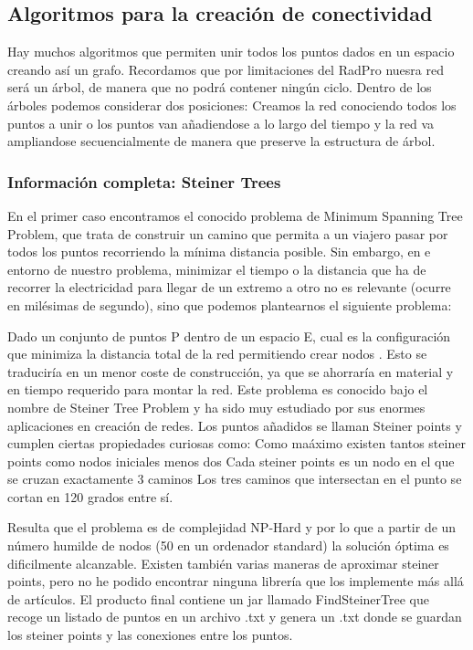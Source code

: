 \documentclass[12pt,a4paper,openright,oneside]{article}
\numberwithin{equation}{section}
\theoremstyle{definition}
\begin{document}
\subsection{Algoritmos para la creación de conectividad}
Hay muchos algoritmos que permiten unir todos los puntos dados en un espacio creando así un grafo. Recordamos que por limitaciones del RadPro nuesra red será un árbol, de manera que no podrá contener ningún ciclo. Dentro de los árboles podemos considerar dos posiciones: Creamos la red conociendo todos los puntos a unir o los puntos van añadiendose a lo largo del tiempo y la red va ampliandose secuencialmente de manera que preserve la estructura de árbol.

\subsubsection{Información completa: Steiner Trees}
En el primer caso encontramos el conocido problema de Minimum Spanning Tree Problem, que trata de construir un camino que permita a un viajero pasar por todos los puntos recorriendo la mínima distancia posible. Sin embargo, en e entorno de nuestro problema, minimizar  el tiempo o la distancia que ha de recorrer la electricidad para llegar de un extremo a otro no es relevante (ocurre en milésimas de segundo), sino que podemos plantearnos el siguiente problema:

Dado un conjunto de puntos P dentro de un espacio E, cual es la configuración que minimiza la distancia total de la red permitiendo crear nodos . Esto se traduciría en un menor coste de construcción, ya que se ahorraría en material y en tiempo requerido para montar la red. Este problema es conocido bajo el nombre de Steiner Tree Problem y ha sido muy estudiado por sus enormes aplicaciones en creación de redes. Los puntos añadidos se llaman Steiner points y cumplen ciertas propiedades curiosas como: 
Como maáximo existen tantos steiner points como nodos iniciales menos dos
Cada steiner points es un nodo en el que se cruzan exactamente 3 caminos
Los tres caminos que intersectan en el punto se cortan en 120 grados entre sí.

Resulta que el problema es de complejidad NP-Hard y por lo que a partir de un número humilde de nodos (50 en un ordenador standard) la solución óptima es dificilmente alcanzable. Existen también varias maneras de aproximar steiner points, pero no he podido encontrar ninguna librería que los implemente más allá de artículos. El producto final contiene un jar llamado FindSteinerTree que recoge un listado de puntos en un archivo .txt y genera un .txt donde se guardan los steiner points y las conexiones entre los puntos.
\end{document}
